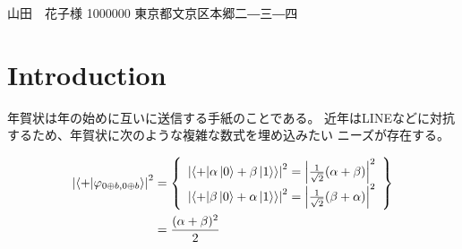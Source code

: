 \documentclass{jletteraddress}
\newcommand{\ket}[1]{\mathinner{\left|{#1}\right\rangle}}
\newcommand{\braket}[2]{\mathinner{\left\langle{#1}\middle|#2\right\rangle}}
\begin{document}
\pagestyle{empty}

\addaddress
  {山田　花子}{様}
  {1000000}
  {東京都文京区本郷二―三―四}
  {}

\newpage


\begin{abstract}
  \footnotesize
  この文章では、新年の挨拶を述べるための手紙である``年賀状''を作る方法について述べる。
  従来の年賀状を作成するソフトウェアは数式やソースコードの埋め込みが貧弱であったが、
  我々はそれを解決す方法として組版ソフト\LaTeX を利用する方法を示す。

  In this paper, we describe how to make a letter to hello new year.
  For conventional softwares that makes those letter,
  it's difficult to write mathmatical expressions or
  programming source code.
  We show how we solve that problem with \LaTeX.
\end{abstract}


\section*{Introduction}



年賀状は年の始めに互いに送信する手紙のことである。
近年はLINEなどに対抗するため、年賀状に次のような複雑な数式を埋め込みたい
ニーズが存在する。

{\scriptsize
\begin{align*}
  \left|\braket{+}{\varphi_{0 \oplus b, 0 \oplus b}}\right|^2 &= \left\{
\begin{array}{l}
\left|\braket{+}{\alpha\ket{0} + \beta\ket{1}}\right|^2 = \left|\frac{1}{\sqrt{2}}(\alpha + \beta)\right|^2 \\
\left|\braket{+}{\beta\ket{0} + \alpha\ket{1}}\right|^2 = \left|\frac{1}{\sqrt{2}}(\beta + \alpha)\right|^2
\end{array}
\right\} \\
&= \frac{(\alpha + \beta)^2}{2}
\end{align*}
}
\end{document}
